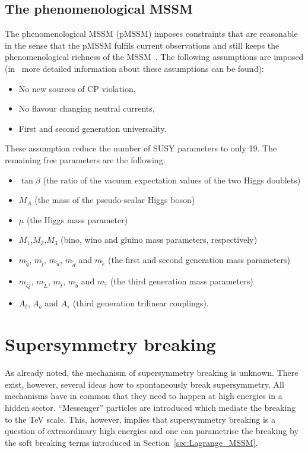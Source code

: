 \subsection{The phenomenological MSSM}
\label{subsec:pMSSM}
The phenomenological MSSM (pMSSM) imposes constraints that are reasonable in the sense that the pMSSM fulfils current observations and still keeps the phenomenological richness of the MSSM~\cite{bib:pMSSM}.
The following assumptions are imposed (in~\cite{bib:pMSSM} more detailed information about these assumptions can be found):
\begin{itemize}
\item No new sources of CP violation,
\item No flavour changing neutral currents,
\item First and second generation universality.
\end{itemize}
These assumption reduce the number of SUSY parameters to only 19.
The remaining free parameters are the following:
\begin{itemize}
\item $\tan \beta$ (the ratio of the vacuum expectation values of the two Higgs doublets)
\item $M_A$ (the mass of the pseudo-scalar Higgs boson)  
\item $\mu$ (the Higgs mass parameter)
\item $M_1$,$M_2$,$M_3$ (bino, wino and gluino mass parameters, respectively)
\item $m_{\tilde{q}}$, $m_{\tilde{l}}$, $m_{\tilde{u}}$, $m_{\tilde{d}}$ and $m_{\tilde{e}}$ (the first and second generation mass parameters)
\item  $m_{\tilde{Q}}$, $m_{\tilde{L}}$, $m_{\tilde{t}}$, $m_{\tilde{b}}$ and $m_{\tilde{\tau}}$ (the third generation mass parameters)
\item $A_t$, $A_b$ and $A_{\tau}$ (third generation trilinear couplings).
\end{itemize}

\section{Supersymmetry breaking}
As already noted, the mechanism of supersymmetry breaking is unknown.
There exist, however, several ideas how to spontaneously break supersymmetry.
All mechanisms have in common that they need to happen at high energies in a hidden sector.
``Messenger'' particles are introduced which mediate the breaking to the TeV scale.
This, however, implies that supersymmetry breaking is a question of extraordinary high energies and one can parametrise the breaking by the soft breaking terms introduced in Section~\ref{sec:Lagrange_MSSM}.

